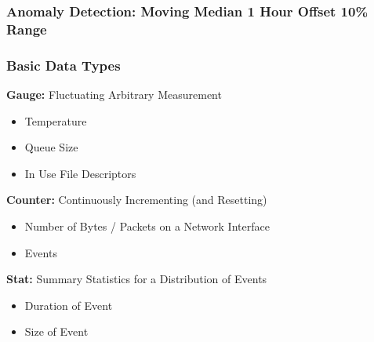 \begin{frame}
    \frametitle{Anomaly Detection: Moving Median 1 Hour Offset 10\% Range}
    \begin{center}

    \end{center}
\end{frame}

\begin{frame}
    \frametitle{Basic Data Types}

    \textbf{Gauge:} Fluctuating Arbitrary Measurement
    \begin{itemize}
        \item Temperature
        \item Queue Size
        \item In Use File Descriptors
    \end{itemize}

    \textbf{Counter:} Continuously Incrementing (and Resetting)
    \begin{itemize}
        \item Number of Bytes / Packets on a Network Interface
        \item Events
    \end{itemize}

    \textbf{Stat:} Summary Statistics for a Distribution of Events
    \begin{itemize}
        \item Duration of Event
        \item Size of Event
    \end{itemize}
\end{frame}

